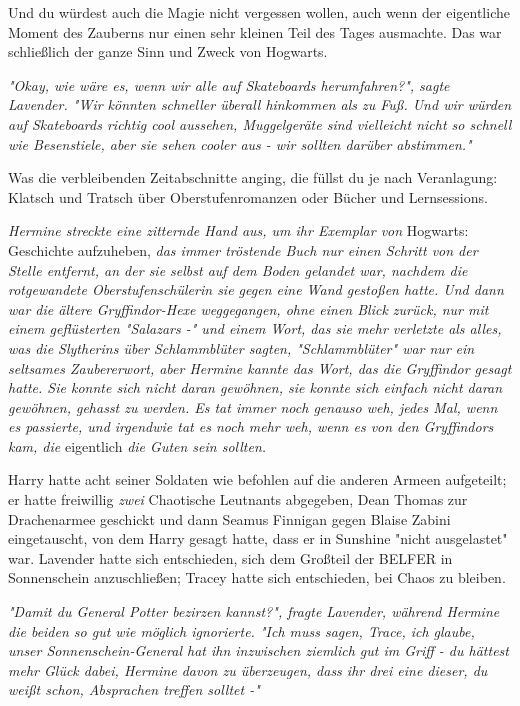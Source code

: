 {Und du würdest auch die Magie nicht vergessen wollen, auch wenn der eigentliche Moment des Zauberns nur einen sehr kleinen Teil des Tages ausmachte. Das war schließlich der ganze Sinn und Zweck von Hogwarts.

\emph{\emph{"Okay, wie wäre es, wenn wir alle auf Skateboards herumfahren?", sagte Lavender. "Wir könnten schneller überall hinkommen als zu Fuß. Und wir würden auf Skateboards richtig cool aussehen, Muggelgeräte sind vielleicht nicht so schnell wie Besenstiele, aber sie sehen cooler aus - wir sollten darüber abstimmen."}}

Was die verbleibenden Zeitabschnitte anging, die füllst du je nach Veranlagung: Klatsch und Tratsch über Oberstufenromanzen oder Bücher und Lernsessions.

\emph{Hermine streckte eine zitternde Hand aus, um ihr Exemplar von} Hogwarts: Geschichte aufzuheben, \emph{das immer tröstende Buch nur einen Schritt von der Stelle entfernt, an der sie selbst auf dem Boden gelandet war, nachdem die rotgewandete Oberstufenschülerin sie gegen eine Wand gestoßen hatte. Und dann war die ältere Gryffindor-Hexe weggegangen, ohne einen Blick zurück, nur mit einem geflüsterten "Salazars -" und einem Wort, das sie mehr verletzte als alles, was die Slytherins über Schlammblüter sagten, "Schlammblüter" war nur} \emph{ein seltsames Zaubererwort, aber Hermine kannte das Wort, das die Gryffindor gesagt hatte. Sie konnte sich nicht daran gewöhnen, sie konnte sich einfach nicht daran gewöhnen, gehasst zu werden. Es tat immer noch genauso weh, jedes Mal, wenn es passierte, und irgendwie tat es noch mehr weh, wenn es von den Gryffindors kam, die} eigentlich \emph{die Guten sein sollten.}

Harry hatte acht seiner Soldaten wie befohlen auf die anderen Armeen aufgeteilt; er hatte freiwillig \emph{zwei} Chaotische Leutnants abgegeben, Dean Thomas zur Drachenarmee geschickt und dann Seamus Finnigan gegen Blaise Zabini eingetauscht, von dem Harry gesagt hatte, dass er in Sunshine "nicht ausgelastet" war. Lavender hatte sich entschieden, sich dem Großteil der BELFER in Sonnenschein anzuschließen; Tracey hatte sich entschieden, bei Chaos zu bleiben.

\emph{\emph{"Damit du General Potter bezirzen kannst?", fragte Lavender, während Hermine die beiden so gut wie möglich ignorierte. "Ich muss sagen, Trace, ich glaube, unser Sonnenschein-General hat ihn inzwischen ziemlich gut im Griff - du hättest mehr Glück dabei, Hermine davon zu überzeugen, dass ihr drei eine dieser, du weißt schon, Absprachen treffen solltet -"}}

}
